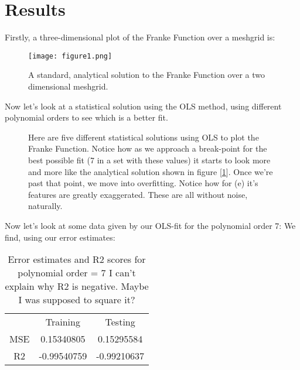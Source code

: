 \documentclass{article}
\begin{document}
\section{Results}
Firstly, a three-dimensional plot of the Franke Function over a meshgrid is:
\begin{figure}[ht!]
    \centering
    \texttt{[image: figure1.png]}
    \caption{A standard, analytical solution to the Franke Function over a two dimensional meshgrid.}
    \label{fig:my_label}
\end{figure}
\newline
Now let's look at a statistical solution using the OLS method, using different polynomial orders to see which is a better fit.
\begin{figure}
\centering
{}
\newline
{}
\newline
{}
\caption{Here are five different statistical solutions using OLS to plot the Franke Function. Notice how as we approach a break-point for the best possible fit (7 in a set with these values) it starts to look more and more like the analytical solution shown in figure [\ref{fig:my_label}]. Once we're past that point, we move into overfitting. Notice how for (e) it's features are greatly exaggerated. \newline These are all without noise, naturally.}
\end{figure}
Now let's look at some data given by our OLS-fit for the polynomial order 7:
\newpage We find, using our error estimates:
\begin{table}[ht!]
    \centering
    \begin{tabular}{c|c|c}
        & Training& Testing&  \\
        MSE & 0.15340805& 0.15295584& \\
        R2 & -0.99540759& -0.99210637
    \end{tabular}
    \caption{Error estimates and R2 scores for polynomial order = 7 \newline
    I can't explain why R2 is negative. Maybe I was supposed to square it?}
    \label{tab:my_label}
\end{table}
\end{document}
